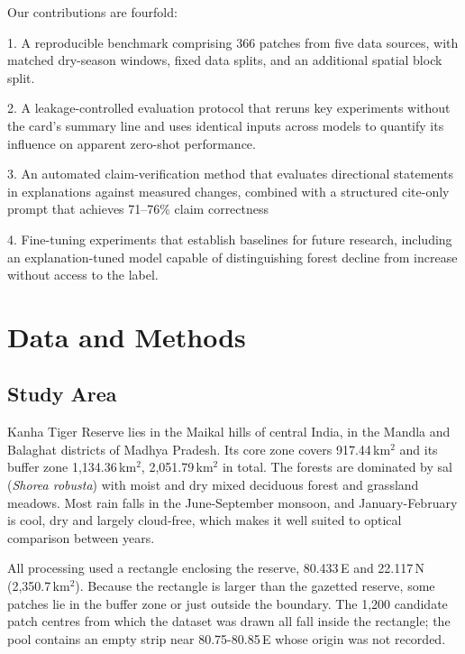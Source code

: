 \documentclass[11pt]{article}
\begin{document}
Our contributions are fourfold:

1. A reproducible benchmark comprising 366 patches from five data sources, with matched dry-season windows, fixed data splits, and an additional spatial block split.

2. A leakage-controlled evaluation protocol that reruns key experiments without the card’s summary line and uses identical inputs across models to quantify its influence on apparent zero-shot performance.

3. An automated claim-verification method that evaluates directional statements in explanations against measured changes, combined with a structured cite-only prompt that achieves 71--76\% claim correctness

4. Fine-tuning experiments that establish baselines for future research, including an explanation-tuned model capable of distinguishing forest decline from increase without access to the label.


\section{Data and Methods}
\label{sec:methods}

\subsection{Study Area}

Kanha Tiger Reserve lies in the Maikal hills of central India, in the
Mandla and Balaghat districts of Madhya Pradesh. Its core zone covers
917.44\,km$^2$ and its buffer zone 1,134.36\,km$^2$, 2,051.79\,km$^2$ in
total. The forests are dominated by sal
(\emph{Shorea robusta}) with moist and dry mixed deciduous forest and
grassland meadows. Most rain falls in the
June-September monsoon, and January-February is cool, dry and largely
cloud-free, which makes it well suited to optical comparison between
years.

All processing used a rectangle enclosing the reserve,
80.433\textdegree\,E and
22.117\textdegree\,N (2,350.7\,km$^2$). Because the
rectangle is larger than the gazetted reserve, some patches lie in the
buffer zone or just outside the boundary. The 1,200 candidate patch
centres from which the dataset was drawn all fall inside the rectangle;
the pool contains an empty strip near 80.75-80.85\textdegree\,E whose
origin was not recorded.
\end{document}
